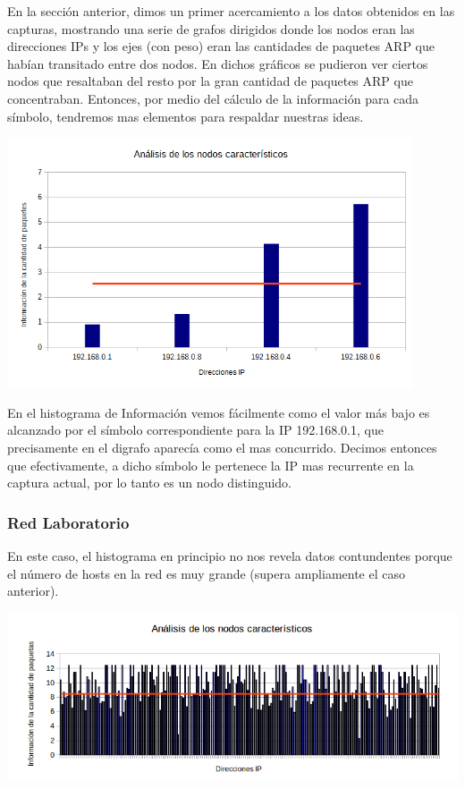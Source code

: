 En la sección anterior, dimos un primer acercamiento a los datos obtenidos en las capturas, mostrando una serie de grafos dirigidos donde los nodos eran las direcciones IPs y los ejes (con peso) eran las cantidades de paquetes ARP que habían transitado entre dos nodos. En dichos gráficos se pudieron ver ciertos nodos que resaltaban del resto por la gran cantidad de paquetes ARP que concentraban. Entonces, por medio del cálculo de la información para cada símbolo, tendremos mas elementos para respaldar nuestras ideas.

\centerline{\includegraphics[width=0.9\textwidth]{./graficos/paquetesVSIP/casa_mari.png}}

En el histograma de Información vemos fácilmente como el valor más bajo es alcanzado por el símbolo correspondiente para la IP 192.168.0.1, que precisamente en el digrafo aparecía como el mas concurrido. Decimos entonces que efectivamente, a dicho símbolo le pertenece la IP mas recurrente en la captura actual, por lo tanto es un nodo distinguido.

\subsubsection{Red Laboratorio}

En este caso, el histograma en principio no nos revela datos contundentes porque el número de hosts en la red es muy grande (supera ampliamente el caso anterior).

\centerline{\includegraphics[width=1\textwidth]{./graficos/paquetesVSIP/labo5_muchos.png}}

